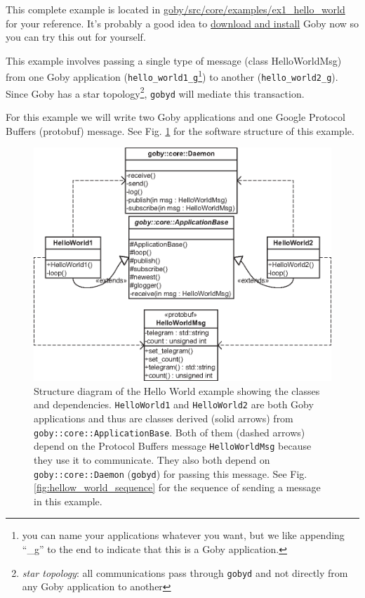\documentclass[11pt, letterpaper, oneside]{memoir}
\begin{document}
This complete example is located in \href{http://bazaar.launchpad.net/~goby-dev/goby/trunk/files/head:/src/core/examples/ex1_hello_world}{goby/src/core/examples/ex1\_hello\_world} for your reference. It's probably a good idea to \href{http://gobysoft.com/doc}{download and install} Goby now so you can try this out for yourself.

This example involves passing a single type of message (class HelloWorldMsg) from one Goby application (\verb|hello_world1_g|\footnote{you can name your applications whatever you want, but we like appending ``\_g'' to the end to indicate that this is a Goby application.}) to another (\verb|hello_world2_g|). Since Goby has a star topology\footnote{\textit{star topology}: all communications pass through \texttt{gobyd} and not directly from any Goby application to another}, \texttt{gobyd} will mediate this transaction.

For this example we will write two Goby applications and one Google Protocol Buffers (protobuf) message. See Fig. \ref{fig:hellow_world_structure} for the software structure of this example.

\begin{figure}
\centering
\includegraphics[scale=0.9]{hello_world_structure}
\caption{Structure diagram of the Hello World example showing the classes and dependencies. \texttt{HelloWorld1} and \texttt{HelloWorld2} are both Goby applications and thus are classes derived (solid arrows) from \texttt{goby::core::ApplicationBase}. Both of them (dashed arrows) depend on the Protocol Buffers message \texttt{HelloWorldMsg} because they use it to communicate. They also both depend on \texttt{goby::core::Daemon} (\texttt{gobyd}) for passing this message. See Fig. \ref{fig:hellow_world_sequence} for the sequence of sending a message in this example.}
\label{fig:hellow_world_structure}
\end{figure}
\end{document}
